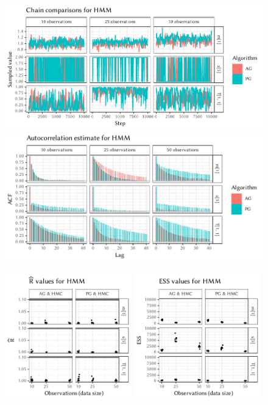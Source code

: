 \cleartorecto
\FloatBlock

\begin{figure}[p]
  \centering
  \includegraphics[width=\textwidth]{figures/HMM-chains}
  \par
  \includegraphics[width=\textwidth]{figures/HMM-acfs}
  \par
  \includegraphics[width=0.49\textwidth]{figures/HMM-rhat}
  \includegraphics[width=0.49\textwidth]{figures/HMM-ess}
  \caption{}
  \label{fig:plots-hmm-right}
\end{figure}

